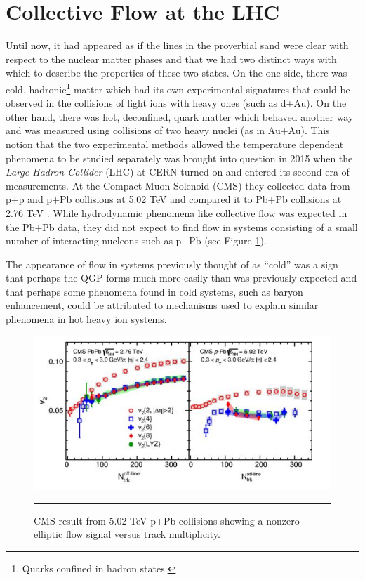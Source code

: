 \section{Collective Flow at the LHC}
Until now, it had appeared as if the lines in the proverbial sand were clear with respect to the nuclear matter phases and that we had two distinct ways with which to describe the properties of these two states. On the one side, there was cold, hadronic\footnote{Quarks confined in hadron states.} matter which had its own experimental signatures that could be observed in the collisions of light ions with heavy ones (such as d+Au). On the other hand, there was hot, deconfined, quark matter which behaved another way and was measured using collisions of two heavy nuclei (as in Au+Au). This notion that the two experimental methods allowed the temperature dependent phenomena to be studied separately was brought into question in 2015 when the \textit{Large Hadron Collider} (LHC) at CERN turned on and entered its second era of measurements. At the Compact Muon Solenoid (CMS) they collected data from p+p and p+Pb collisions at 5.02 TeV and compared it to Pb+Pb collisions at 2.76 TeV \citep{Khachatryan:2015waa}. While hydrodynamic phenomena like collective flow was expected in the Pb+Pb data, they did not expect to find flow in systems consisting of a small number of interacting nucleons such as p+Pb (see Figure \ref{fig:pPbflow}).
 
The appearance of flow in systems previously thought of as ``cold'' was a sign that perhaps the QGP forms much more easily than was previously expected and that perhaps some phenomena found in cold systems, such as baryon enhancement, could be attributed to mechanisms used to explain similar phenomena in hot heavy ion systems.

\begin{figure}[H]

    \includegraphics[width=1\textwidth]{prevplots/pPbflowLHC.JPG}
\rule{35em}{0.5pt}
  \caption[Elliptic Flow in p+Pb at the LHC]{CMS result from 5.02 TeV p+Pb collisions showing a nonzero elliptic flow signal versus track multiplicity. \citep{Khachatryan:2015waa}}\label{fig:pPbflow}
\end{figure} 

